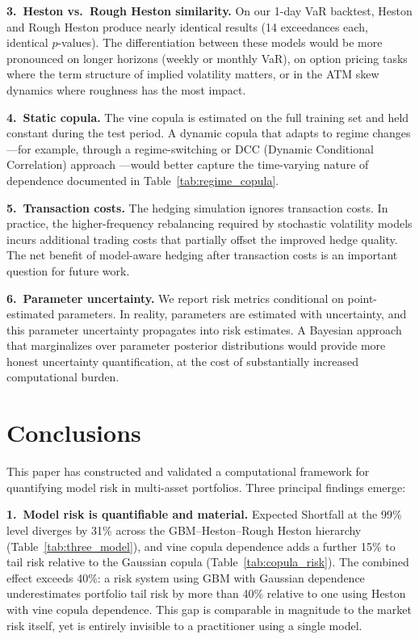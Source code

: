 \documentclass[11pt,a4paper]{article}
\begin{document}
\textbf{3.\ Heston vs.\ Rough Heston similarity.}
On our 1-day VaR backtest, Heston and Rough Heston produce nearly identical results (14 exceedances each, identical $p$-values).
The differentiation between these models would be more pronounced on longer horizons (weekly or monthly VaR), on option pricing tasks where the term structure of implied volatility matters, or in the ATM skew dynamics where roughness has the most impact.

\textbf{4.\ Static copula.}
The vine copula is estimated on the full training set and held constant during the test period.
A dynamic copula that adapts to regime changes---for example, through a regime-switching or DCC (Dynamic Conditional Correlation) approach \citep{engle1982}---would better capture the time-varying nature of dependence documented in Table~\ref{tab:regime_copula}.

\textbf{5.\ Transaction costs.}
The hedging simulation ignores transaction costs.
In practice, the higher-frequency rebalancing required by stochastic volatility models incurs additional trading costs that partially offset the improved hedge quality.
The net benefit of model-aware hedging after transaction costs is an important question for future work.

\textbf{6.\ Parameter uncertainty.}
We report risk metrics conditional on point-estimated parameters.
In reality, parameters are estimated with uncertainty, and this parameter uncertainty propagates into risk estimates.
A Bayesian approach that marginalizes over parameter posterior distributions would provide more honest uncertainty quantification, at the cost of substantially increased computational burden.


\section{Conclusions}
\label{sec:conclusion}

This paper has constructed and validated a computational framework for quantifying model risk in multi-asset portfolios.
Three principal findings emerge:

\textbf{1.\ Model risk is quantifiable and material.}
Expected Shortfall at the 99\% level diverges by 31\% across the GBM--Heston--Rough Heston hierarchy (Table~\ref{tab:three_model}), and vine copula dependence adds a further 15\% to tail risk relative to the Gaussian copula (Table~\ref{tab:copula_risk}).
The combined effect exceeds 40\%: a risk system using GBM with Gaussian dependence underestimates portfolio tail risk by more than 40\% relative to one using Heston with vine copula dependence.
This gap is comparable in magnitude to the market risk itself, yet is entirely invisible to a practitioner using a single model.
\end{document}
